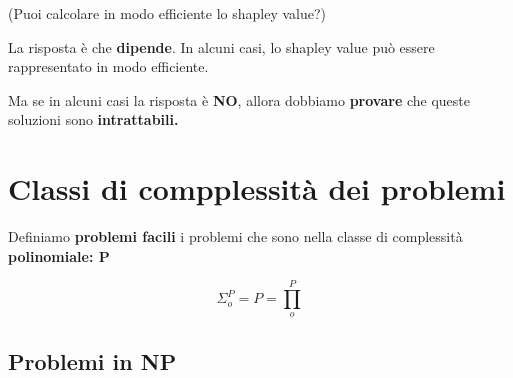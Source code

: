 \begin{figure}[H]
    \begin{center}
    \end{center}
\end{figure}

\begin{domanda}(Puoi calcolare in modo efficiente lo shapley value?)
\end{domanda}

La risposta è che \textbf{dipende}. In alcuni casi, lo shapley value può essere
rappresentato in modo efficiente.

Ma se in alcuni casi la risposta è \textbf{NO}, allora dobbiamo
\textbf{provare} che queste soluzioni sono \textbf{intrattabili.}

\newpage

\section{Classi di compplessità dei problemi}

Definiamo \textbf{problemi facili} i problemi che sono nella classe di
complessità \textbf{polinomiale: P}

\[
    \Sigma_o^P  = P = \prod_o^P
\]

\subsection{Problemi in NP}

